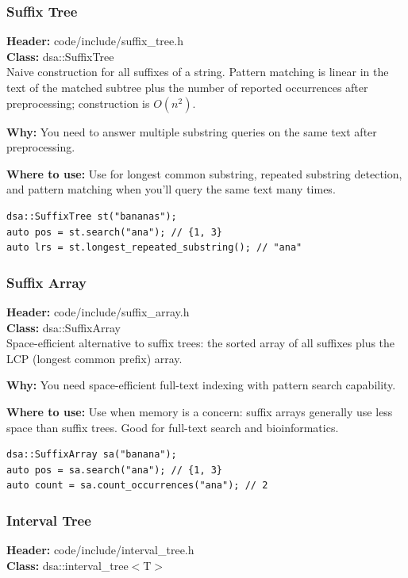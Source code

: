 \documentclass[11pt]{article}
\begin{document}
\subsubsection{Suffix Tree}
\textbf{Header:} code/include/suffix\_tree.h\\
\textbf{Class:} dsa::SuffixTree\\

Naive construction for all suffixes of a string. Pattern matching is linear in the text of the matched subtree plus the number of reported occurrences after preprocessing; construction is \(O(n^2)\).

\textbf{Why:} You need to answer multiple substring queries on the same text after preprocessing. \par \textbf{Where to use:} Use for longest common substring, repeated substring detection, and pattern matching when you'll query the same text many times.

\begin{lstlisting}
dsa::SuffixTree st("bananas");
auto pos = st.search("ana"); // {1, 3}
auto lrs = st.longest_repeated_substring(); // "ana"
\end{lstlisting}

\subsubsection{Suffix Array}
\textbf{Header:} code/include/suffix\_array.h\\
\textbf{Class:} dsa::SuffixArray\\

Space-efficient alternative to suffix trees: the sorted array of all suffixes plus the LCP (longest common prefix) array.

\textbf{Why:} You need space-efficient full-text indexing with pattern search capability. \par \textbf{Where to use:} Use when memory is a concern: suffix arrays generally use less space than suffix trees. Good for full-text search and bioinformatics.

\begin{lstlisting}
dsa::SuffixArray sa("banana");
auto pos = sa.search("ana"); // {1, 3}
auto count = sa.count_occurrences("ana"); // 2
\end{lstlisting}

\subsubsection{Interval Tree}
\textbf{Header:} code/include/interval\_tree.h\\
\textbf{Class:} dsa::interval\_tree$<$T$>$\\
\end{document}
